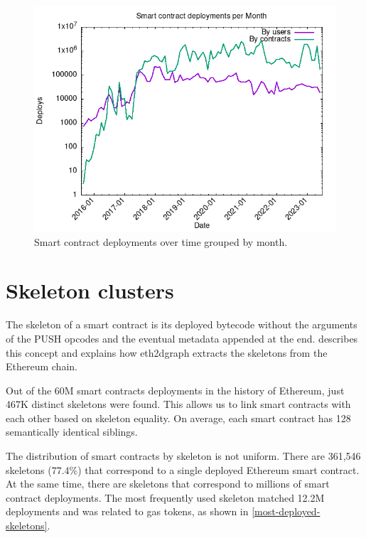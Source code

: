 \begin{figure}[!ht]
    \centering
    \includegraphics[width=1\textwidth]{Figures/analysis/deploys_per_month.png}
    \caption{Smart contract deployments over time grouped by month.}
    \label{fig:deploy-history}
\end{figure}


\newpage

\section{Skeleton clusters}

The skeleton of a smart contract is its deployed bytecode without the arguments of the PUSH opcodes and the eventual metadata appended at the end.  describes this concept and explains how eth2dgraph extracts the skeletons from the Ethereum chain.

Out of the 60M smart contracts deployments in the history of Ethereum, just 467K distinct skeletons were found. This allows us to link smart contracts with each other based on skeleton equality. On average, each smart contract has 128 semantically identical siblings. 

The distribution of smart contracts by skeleton is not uniform. There are 361,546 skeletons (77.4\%) that correspond to a single deployed Ethereum smart contract. At the same time, there are skeletons that correspond to millions of smart contract deployments. The most frequently used skeleton matched 12.2M deployments and was related to gas tokens, as shown in \cref{most-deployed-skeletons}.

